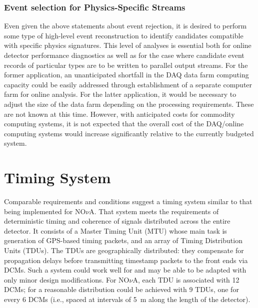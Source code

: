 \subsubsection{Event selection for Physics-Specific Streams}

Even given the above statements about event rejection, it is desired to 
perform some type of high-level event reconstruction to identify candidates 
compatible with specific physics signatures.  This level of analyses is 
essential both for online detector performance diagnostics as well as 
for the case where candidate event records of particular types are to be 
written to parallel output streams.  For the former application, 
an unanticipated shortfall in the DAQ data farm computing capacity 
could be easily addressed through establishment of a separate computer farm 
for online analysis.
For the latter application, it would be necessary to adjust the size of 
the data farm depending on the processing requirements.  These are not 
known at this time.  However, with anticipated costs for commodity 
computing systems, it is not expected that the overall cost of the 
DAQ/online computing systems would increase significantly relative to 
the currently budgeted system.%

\section{Timing System }
\label{sec:v5-trig-timing}

Comparable requirements and conditions suggest a timing system 
similar to that being implemented for NO$\nu$A.  That system meets the 
requirements of deterministic timing and coherence of signals distributed 
across the entire detector.   It consists of a Master Timing Unit (MTU)
whose main task is generation of GPS-based timing packets, and an 
array of Timing Distribution Units (TDUs).  The TDUs are geographically 
distributed: they compensate for propagation delays before transmitting 
timestamp packets to the front ends via DCMs.  Such a system could work 
well for \LBNE and may be able to be adapted with only minor 
design modifications.  For NO$\nu$A, each TDU is associated with 12 DCMs; 
for \LBNE a reasonable distribution could be achieved with 9 TDUs, 
one for every 6 DCMs (i.e., spaced at intervals of 5~m along the 
length of the detector).

